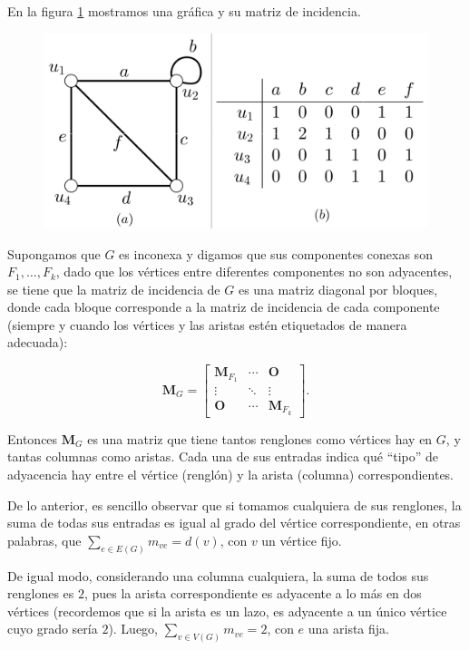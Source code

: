 En la figura \ref{fig:matrizdeincidencia} mostramos una gráfica y su matriz de incidencia.

\begin{figure}[H]
    \centering
    \includegraphics[scale=0.25]{img/imgchapter1/matrizdeincidencia.jpg}
    \caption{}
    \label{fig:matrizdeincidencia}
\end{figure}

Supongamos que $G$ es inconexa y digamos que sus componentes conexas son $F_{1}, \ldots, F_{k}$, dado que los vértices entre diferentes componentes no son adyacentes, se tiene que la matriz de incidencia de $G$ es una matriz diagonal por bloques, donde cada bloque corresponde a la matriz de incidencia de cada componente (siempre y cuando los vértices y las aristas estén etiquetados de manera adecuada):

$$
\mathbf{M}_{G}=\begin{bmatrix}
\mathbf{M}_{F_{1}} & \cdots  & \mathbf{O}\\ 
\vdots & \ddots & \vdots\\ 
\mathbf{O} & \cdots & \mathbf{M}_{F_{k}}
\end{bmatrix}.
$$

Entonces $\mathbf{M}_{G}$ es una matriz que tiene tantos renglones como vértices hay en $G$, y tantas columnas como aristas. Cada una de sus entradas indica qué ``tipo'' de adyacencia hay entre el vértice (renglón) y la arista (columna) correspondientes.  

De lo anterior, es sencillo observar que si tomamos cualquiera de sus renglones, la suma de todas sus entradas es igual al grado del vértice correspondiente, en otras palabras, que $\sum_{e \in E(G)}m_{ve} = d(v)$, con $v$ un vértice fijo.

De igual modo, considerando una columna cualquiera, la suma de todos sus renglones es $2$, pues la arista correspondiente es adyacente a lo más en dos vértices (recordemos que si la arista es un lazo, es adyacente a un único vértice cuyo grado sería $2$). Luego, $\sum_{v \in V(G)}m_{ve} = 2$, con $e$ una arista fija.

